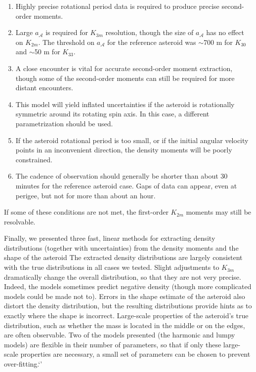\documentclass[fleqn,usenatbib]{mnras}
\begin{document}
\begin{enumerate}
  \item Highly precise rotational period data is required to produce precise second-order moments.
  \item Large $a_\mathcal{A}$ is required for $K_{3m}$ resolution, though the size of $a_\mathcal{A}$ has no effect on $K_{2m}$. The threshold on $a_\mathcal{A}$ for the reference asteroid was $\sim$700 m for $K_{30}$ and $\sim$50 m for $K_{33}$.
  \item A close encounter is vital for accurate second-order moment extraction, though some of the second-order moments can still be required for more distant encounters.
  \item This model will yield inflated uncertainties if the asteroid is rotationally symmetric around its rotating spin axis. In this case, a different parametrization should be used. 
  \item If the asteroid rotational period is too small, or if the initial angular velocity points in an inconvenient direction, the density moments will be poorly constrained.
  \item The cadence of observation should generally be shorter than about 30 minutes for the reference asteroid case. Gaps of data can appear, even at perigee, but not for more than about an hour.
\end{enumerate}

If some of these conditions are not met, the first-order $K_{2m}$ moments may still be resolvable.

Finally, we presented three fast, linear methods for extracting density distributions (together with uncertainties) from the density moments and the shape of the asteroid The extracted density distributions are largely consistent with the true distributions in all cases we tested. Slight adjustments to $K_{3m}$ dramatically change the overall distribution, so that they are not very precise. Indeed, the models sometimes predict negative density (though more complicated models could be made not to). Errors in the shape estimate of the asteroid also distort the density distribution, but the resulting distributions provide hints as to exactly where the shape is incorrect. Large-scale properties of the asteroid's true distribution, such as whether the mass is located in the middle or on the edges, are often observable. Two of the models presented (the harmonic and lumpy models) are flexible in their number of parameters, so that if only these large-scale properties are necessary, a small set of parameters can be chosen to prevent over-fitting.`'
\end{document}
